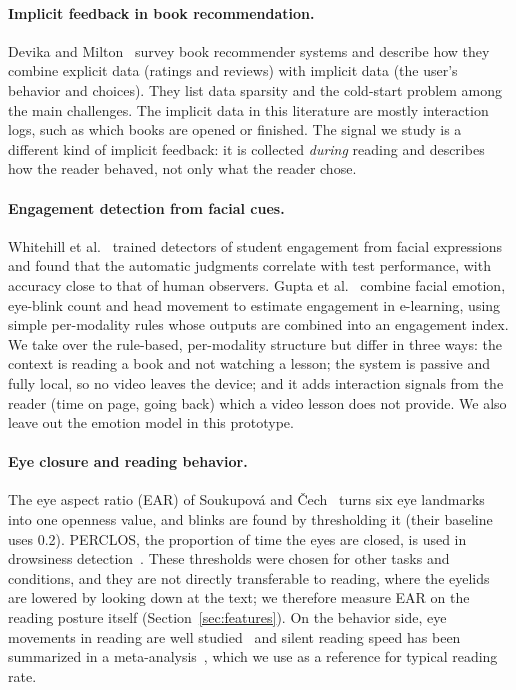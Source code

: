 \documentclass[sigconf,nonacm]{acmart}
\begin{document}
\paragraph{Implicit feedback in book recommendation.}
Devika and Milton~\cite{devika2024book} survey book recommender systems and describe how they combine explicit data
(ratings and reviews) with implicit data (the user's behavior and choices). They list data sparsity and the cold-start
problem among the main challenges. The implicit data in this literature are mostly interaction logs, such as which
books are opened or finished. The signal we study is a different kind of implicit feedback: it is collected
\emph{during} reading and describes how the reader behaved, not only what the reader chose.

\paragraph{Engagement detection from facial cues.}
Whitehill et al.~\cite{whitehill2014faces} trained detectors of student engagement from facial expressions and found
that the automatic judgments correlate with test performance, with accuracy close to that of human observers. Gupta et
al.~\cite{gupta2023multimodal} combine facial emotion, eye-blink count and head movement to estimate engagement in
e-learning, using simple per-modality rules whose outputs are combined into an engagement index. We take over the
rule-based, per-modality structure but differ in three ways: the context is reading a book and not watching a lesson;
the system is passive and fully local, so no video leaves the device; and it adds interaction signals from the reader
(time on page, going back) which a video lesson does not provide. We also leave out the emotion model in this prototype.

\paragraph{Eye closure and reading behavior.}
The eye aspect ratio (EAR) of Soukupov\'a and \v{C}ech~\cite{soukupova2016blink} turns six eye landmarks into one
openness value, and blinks are found by thresholding it (their baseline uses 0.2). PERCLOS, the proportion of time the
eyes are closed, is used in drowsiness detection~\cite{chang2022perclos}. These thresholds were chosen for other tasks
and conditions, and they are not directly transferable to reading, where the eyelids are lowered by looking down at the
text; we therefore measure EAR on the reading posture itself (Section~\ref{sec:features}). On the behavior side, eye
movements in reading are well studied~\cite{rayner1998eye} and silent reading speed has been summarized in a
meta-analysis~\cite{brysbaert2019words}, which we use as a reference for typical reading rate.
\end{document}
